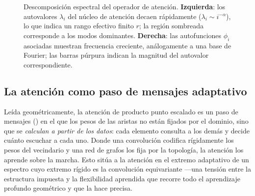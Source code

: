 \begin{figure}[h]
\caption[Descomposici\'on espectral de la atenci\'on]{Descomposici\'on espectral
del operador de atenci\'on. \textbf{Izquierda}: los autovalores $\lambda_i$ del
n\'ucleo de atenci\'on decaen r\'apidamente ($\lambda_i\sim i^{-\alpha}$), lo que
indica un rango efectivo finito $r$; la regi\'on sombreada corresponde a los
modos dominantes. \textbf{Derecha}: las autofunciones $\phi_i$ asociadas muestran
frecuencia creciente, an\'alogamente a una base de Fourier; las barras p\'urpura
indican la magnitud del autovalor correspondiente.}
\label{fig:apps:spectrum}
\end{figure}

\subsection{La atenci\'on como paso de mensajes adaptativo}
\label{subsec:apps:attn-mpnn}

Le\'ida geom\'etricamente, la atenci\'on de producto punto escalado es un paso de
mensajes () en el que los pesos de las aristas no est\'an
fijados por el dominio, sino que se \emph{calculan a partir de los datos}: cada
elemento consulta a los dem\'as y decide cu\'anto escuchar a cada uno. Donde una
convoluci\'on codifica r\'igidamente los pesos del vecindario y una red de grafos
los fija por la topolog\'ia, la atenci\'on los aprende sobre la marcha. Esto
sit\'ua a la atenci\'on en el extremo adaptativo de un espectro cuyo extremo
r\'igido es la convoluci\'on equivariante ---una tensi\'on entre la estructura
impuesta y la flexibilidad aprendida que recorre todo el aprendizaje profundo
geom\'etrico y que la  hace precisa.

